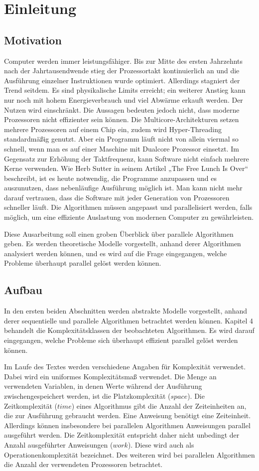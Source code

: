 \section{Einleitung}

\subsection{Motivation}
Computer werden immer leistungsfähiger.
Bis zur Mitte des ersten Jahrzehnts nach der Jahrtausendwende stieg der
Prozessortakt kontinuierlich an und die Ausführung einzelner Instruktionen
wurde optimiert.
Allerdings stagniert der Trend seitdem.
Es sind physikalische Limits erreicht; ein weiterer Anstieg kann nur noch
mit hohem Energieverbrauch und viel Abwärme erkauft werden.
Der Nutzen wird einschränkt.
Die Aussagen bedeuten jedoch nicht, dass moderne Prozessoren nicht effizienter
sein können.
Die Multicore-Architekturen setzen mehrere Prozessoren auf einem Chip ein,
zudem wird Hyper-Threading standardmäßig genutzt.
Aber ein Programm läuft nicht von allein viermal so schnell, wenn man es auf
einer Maschine mit Dualcore Prozessor einsetzt.
Im Gegensatz zur Erhöhung der Taktfrequenz, kann Software nicht einfach mehrere
Kerne verwenden.
Wie Herb Sutter in seinem Artikel „The Free Lunch Is Over“
\cite{sutterlunch} beschreibt, ist es heute notwendig, die Programme anzupassen
und es auszunutzen, dass nebenläufige Ausführung möglich ist.
Man kann nicht mehr darauf vertrauen, dass die Software mit jeder Generation
von Prozessoren schneller läuft.
Die Algorithmen müssen angepasst und parallelisiert werden, falls möglich, um
eine effiziente Auslastung von modernen Computer zu gewährleisten.

Diese Ausarbeitung soll einen groben Überblick über parallele Algorithmen geben.
Es werden theoretische Modelle vorgestellt, anhand derer Algorithmen analysiert
werden können, und es wird auf die Frage eingegangen, welche Probleme überhaupt
parallel gelöst werden können.

\subsection{Aufbau}
In den ersten beiden Abschnitten werden abstrakte Modelle vorgestellt, anhand
derer sequentielle und parallele Algorithmen betrachtet werden können.
Kapitel 4 behandelt die Komplexitätsklassen der beobachteten Algorithmen.
Es wird darauf eingegangen, welche Probleme sich überhaupt effizient parallel
gelöst werden können.

Im Laufe des Textes werden verschiedene Angaben für Komplexität verwendet.
Dabei wird ein uniformes Komplexitätsmaß verwendet.
Die Menge an verwendeten Variablen, in denen Werte während der Ausführung
zwischengespeichert werden, ist die Platzkomplexität ($space$).
Die Zeitkomplexität ($time$) eines Algorithmus gibt die Anzahl der
Zeiteinheiten an, die zur Ausführung gebraucht werden.
Eine Anweisung benötigt eine Zeiteinheit.
Allerdings können insbesondere bei parallelen Algorithmen Anweisungen parallel
ausgeführt werden.
Die Zeitkomplexität entspricht daher nicht unbedingt der Anzahl ausgeführter
Anweisungen ($work$).
Diese wird auch als Operationenkomplexität bezeichnet.
Des weiteren wird bei parallelen Algorithmen die Anzahl der verwendeten
Prozessoren betrachtet.
